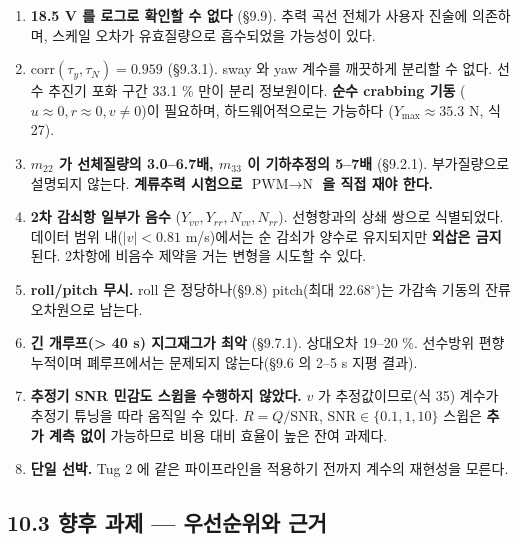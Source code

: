 \documentclass[10pt,a4paper]{article}
\begin{document}
\begin{enumerate}[leftmargin=1.5em,itemsep=2pt,parsep=2pt,topsep=3pt]
\item \textbf{18.5 V 를 로그로 확인할 수 없다} (\S{}9.9). 추력 곡선 전체가 사용자 진술에 의존하며, 스케일 오차가 유효질량으로 흡수되었을 가능성이 있다.
\item \textbf{$\mathrm{corr}(\tau_y, \tau_N) = 0.959$} (\S{}9.3.1). sway 와 yaw 계수를 깨끗하게 분리할 수 없다. 선수 추진기 포화 구간 33.1 \% 만이 분리 정보원이다. \textbf{순수 crabbing 기동} ($u \approx 0, r \approx 0, v \neq 0$)이 필요하며, 하드웨어적으로는 가능하다 ($Y_{\max} \approx 35.3$ N, 식 27).
\item \textbf{$m_{22}$ 가 선체질량의 3.0--6.7배, $m_{33}$ 이 기하추정의 5--7배} (\S{}9.2.1). 부가질량으로 설명되지 않는다. \textbf{계류추력 시험으로 $\text{PWM} \to \text{N}$ 을 직접 재야 한다.}
\item \textbf{2차 감쇠항 일부가 음수} ($Y_{vv}, Y_{rr}, N_{vv}, N_{rr}$). 선형항과의 상쇄 쌍으로 식별되었다. 데이터 범위 내($|v| < 0.81$ m/s)에서는 순 감쇠가 양수로 유지되지만 \textbf{외삽은 금지}된다. 2차항에 비음수 제약을 거는 변형을 시도할 수 있다.
\item \textbf{roll/pitch 무시.} roll 은 정당하나(\S{}9.8) pitch(최대 22.68$^\circ$)는 가감속 기동의 잔류 오차원으로 남는다.
\item \textbf{긴 개루프(> 40 s) 지그재그가 최악} (\S{}9.7.1). 상대오차 19--20 \%. 선수방위 편향 누적이며 폐루프에서는 문제되지 않는다(\S{}9.6 의 2--5 s 지평 결과).
\item \textbf{추정기 SNR 민감도 스윕을 수행하지 않았다.} $v$ 가 추정값이므로(식 35) 계수가 추정기 튜닝을 따라 움직일 수 있다. $R = Q/\mathrm{SNR}$, $\mathrm{SNR} \in \{0.1, 1, 10\}$ 스윕은 \textbf{추가 계측 없이} 가능하므로 비용 대비 효율이 높은 잔여 과제다.
\item \textbf{단일 선박.} Tug 2 에 같은 파이프라인을 적용하기 전까지 계수의 재현성을 모른다.
\end{enumerate}

\subsection*{10.3 향후 과제 --- 우선순위와 근거}
\end{document}
